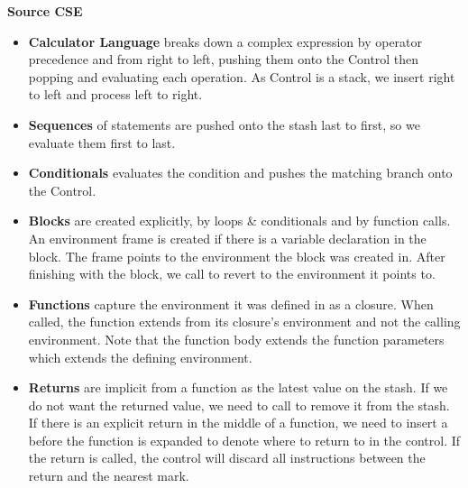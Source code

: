 \begin{center}
     \textbf{Source CSE}
\end{center}
\begin{itemize}
    \item \textbf{Calculator Language} breaks down a complex expression by operator precedence and from right to left, pushing them onto the Control then popping and evaluating each operation. As Control is a stack, we insert right to left and process left to right.
    \item \textbf{Sequences} of statements are pushed onto the stash last to first, so we evaluate them first to last.
    \item \textbf{Conditionals} evaluates the condition and pushes the matching branch onto the Control.
    \item \textbf{Blocks} are created explicitly, by loops \& conditionals and by function calls. An environment frame is created if there is a variable declaration in the block. The frame points to the environment the block was created in. After finishing with the block, we call  to revert to the environment it points to.
    \item \textbf{Functions} capture the environment it was defined in as a closure. When called, the function extends from its closure's environment and not the calling environment. Note that the function body extends the function parameters which extends the defining environment. 
    \item \textbf{Returns} are implicit from a function as the latest value on the stash. If we do not want the returned value, we need to call  to remove it from the stash. If there is an explicit return in the middle of a function, we need to insert a  before the function is expanded to denote where to return to in the control. If the return is called, the control will discard all instructions between the return and the nearest mark.
\end{itemize}

